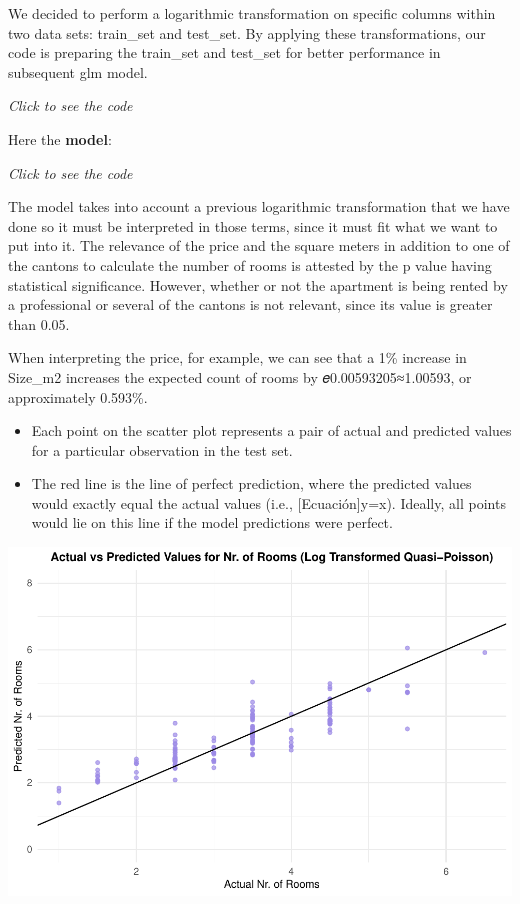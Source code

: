 \documentclass[
]{article}
\begin{document}
We decided to perform a logarithmic transformation on specific columns
within two data sets: train\_set and test\_set. By applying these
transformations, our code is preparing the train\_set and test\_set for
better performance in subsequent glm model.

\emph{Click to see the code}

Here the \textbf{model}:

\emph{Click to see the code}

The model takes into account a previous logarithmic transformation that
we have done so it must be interpreted in those terms, since it must fit
what we want to put into it. The relevance of the price and the square
meters in addition to one of the cantons to calculate the number of
rooms is attested by the p value having statistical significance.
However, whether or not the apartment is being rented by a professional
or several of the cantons is not relevant, since its value is greater
than 0.05.

When interpreting the price, for example, we can see that a 1\% increase
in Size\_m2 increases the expected count of rooms by
𝑒0.00593205≈1.00593, or approximately 0.593\%.

\begin{itemize}
\item
  Each point on the scatter plot represents a pair of actual and
  predicted values for a particular observation in the test set.
\item
  The red line is the line of perfect prediction, where the predicted
  values would exactly equal the actual values (i.e.,
  {[}Ecuación{]}y=x). Ideally, all points would lie on this line if the
  model predictions were perfect.
\end{itemize}

\includegraphics{2024_groupXX_report_files/figure-latex/GLM Poisson 3-1.pdf}
\end{document}
